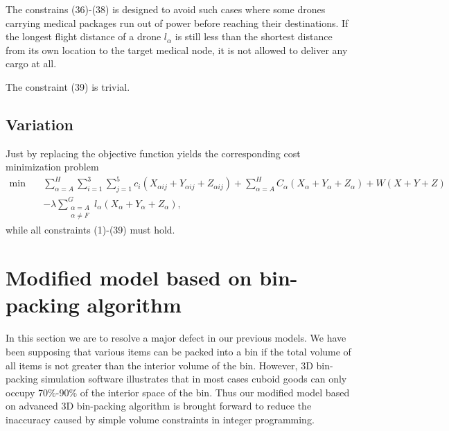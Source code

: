 \documentclass{mcmthesis}
\begin{document}
\noindent The constrains (36)-(38) is designed to avoid such cases where some drones carrying medical packages run out of power before reaching their destinations. If the longest flight distance of a drone $l_{\alpha}$ is still less than the shortest distance from its own location to the target medical node, it is not allowed to deliver any cargo at all.

\noindent The constraint (39) is trivial.
\subsection{Variation}
Just by replacing the objective function yields the corresponding cost minimization problem
\[
\begin{aligned}
\min\quad&\sum_{\alpha=A}^{H}\sum_{i=1}^{3}\sum_{j=1}^{5}c_{i}\left(X_{\alpha ij}+Y_{\alpha ij}+Z_{\alpha ij}\right)
+\sum_{\alpha=A}^{H}C_{{\alpha}}\left(X_{\alpha}+Y_{\alpha }+Z_{\alpha }\right)+W(X+Y+Z)\\
&-\lambda\sum_{\substack{\alpha=A\\ \alpha\ne F}}^{G}l_\alpha (X_\alpha+Y_\alpha+Z_\alpha),
\end{aligned}
\]
while all constraints (1)-(39) must hold.


\section{Modified model based on bin-packing algorithm}

In this section we are to resolve a major defect in our previous models. We have been supposing that various items can be packed into a bin if the total volume of all items is not greater than the interior volume of the bin. However, 3D bin-packing simulation software illustrates that in most cases cuboid goods can only occupy 70\%-90\% of the interior space of the bin. Thus our modified model based on advanced 3D bin-packing algorithm is brought forward to reduce the inaccuracy caused by simple volume constraints in integer programming.
\end{document}
